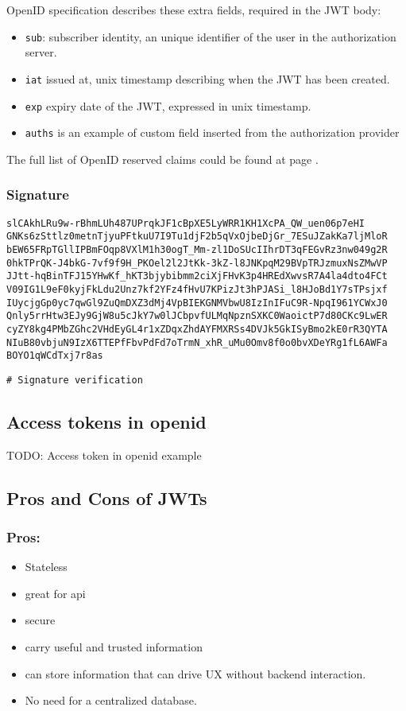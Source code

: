 OpenID specification describes these extra fields, required in the JWT body:
\begin{itemize}
    \item \texttt{sub}: subscriber identity, an unique identifier of the user in
        the authorization server.
    \item \texttt{iat} issued at, unix timestamp describing when the JWT has
        been created.
    \item \texttt{exp} expiry date of the JWT, expressed in unix timestamp.
    \item \texttt{auths} is an example of custom field inserted from the authorization
        provider
\end{itemize}

The full list of OpenID reserved claims could be found at page \pageref{openid}.

\subsubsection{Signature}
\begin{lstlisting}
slCAkhLRu9w-rBhmLUh487UPrqkJF1cBpXE5LyWRR1KH1XcPA_QW_uen06p7eHI
GNKs6zSttlz0metnTjyuPFtkuU7I9Tu1djF2b5qVxOjbeDjGr_7ESuJZakKa7ljMloR
bEW65FRpTGllIPBmFOqp8VXlM1h30ogT_Mm-zl1DoSUcIIhrDT3qFEGvRz3nw049g2R
0hkTPrQK-J4bkG-7vf9f9H_PKOel2l2JtKk-3kZ-l8JNKpqM29BVpTRJzmuxNsZMwVP
JJtt-hqBinTFJ15YHwKf_hKT3bjybibmm2ciXjFHvK3p4HREdXwvsR7A4la4dto4FCt
V09IG1L9eF0kyjFkLdu2Unz7kf2YFz4fHvU7KPizJt3hPJASi_l8HJoBd1Y7sTPsjxf
IUycjgGp0yc7qwGl9ZuQmDXZ3dMj4VpBIEKGNMVbwU8IzInIFuC9R-NpqI961YCWxJ0
Qnly5rrHtw3EJy9GjW8u5cJkY7w0lJCbpvfULMqNpznSXKC0WaoictP7d80CKc9LwER
cyZY8kg4PMbZGhc2VHdEyGL4r1xZDqxZhdAYFMXRSs4DVJk5GkISyBmo2kE0rR3QYTA
NIuB80vbjuN9IzX6TTEPfFbvPdFd7oTrmN_xhR_uMu0Omv8f0o0bvXDeYRg1fL6AWFa
BOYO1qWCdTxj7r8as
\end{lstlisting}

\begin{lstlisting}
# Signature verification
\end{lstlisting}

\subsection{Access tokens in openid}
TODO: Access token in openid example

\subsection{Pros and Cons of JWTs}
\subsubsection{Pros:}
\begin{itemize}
    \item Stateless
    \item great for api
    \item secure
    \item carry useful and trusted information
    \item can store information that can drive UX without backend interaction.
    \item No need for a centralized database.
\end{itemize}
